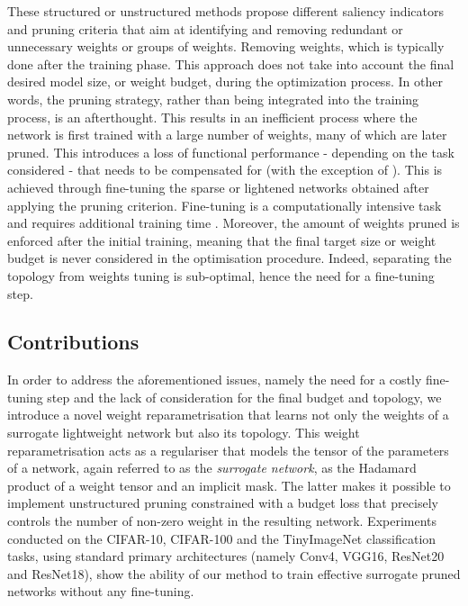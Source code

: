 These structured or unstructured methods propose different saliency indicators
and pruning criteria that aim at identifying and removing redundant or
unnecessary weights or groups of weights. Removing weights, which is typically
done after the training phase. This approach does not take into account the
final desired model size, or weight budget, during the optimization process. In
other words, the pruning strategy, rather than being integrated into the
training process, is an afterthought. This results in an inefficient process
where the network is first trained with a large number of weights, many of which
are later pruned. This introduces a loss of functional performance - depending
on the task considered - that needs to be compensated for (with the exception of
\cite{DBLP:conf/icml/KangH20,DBLP:conf/nips/HassibiS92}). This is achieved
through fine-tuning the sparse or lightened networks obtained after applying the
pruning criterion. Fine-tuning is a computationally intensive task and requires
additional training time
\cite{DBLP:conf/nips/HanPTD15,DBLP:journals/corr/HanMD15}. Moreover, the amount
of weights pruned is enforced after the initial training, meaning that the final
target size or weight budget is never considered in the optimisation procedure.
Indeed, separating the topology from weights tuning is sub-optimal, hence the
need for a fine-tuning step. \\

\subsection{Contributions}

In order to address the aforementioned issues, namely the need for a costly
fine-tuning step and the lack of consideration for the final budget and
topology, we introduce a novel weight reparametrisation that learns not only the
weights of a surrogate lightweight network but also its topology. This weight
reparametrisation acts as a regulariser that models the tensor of the parameters
of a network, again referred to as the \textit{surrogate network}, as the
Hadamard product of a weight tensor and an implicit mask. The latter makes it
possible to implement unstructured pruning constrained with a budget loss that
precisely controls the number of non-zero weight in the resulting network.
Experiments conducted on the CIFAR-10, CIFAR-100 and the TinyImageNet
classification tasks, using standard primary architectures (namely Conv4, VGG16,
ResNet20 and ResNet18), show the ability of our method to train effective
surrogate pruned networks without any fine-tuning.\\

